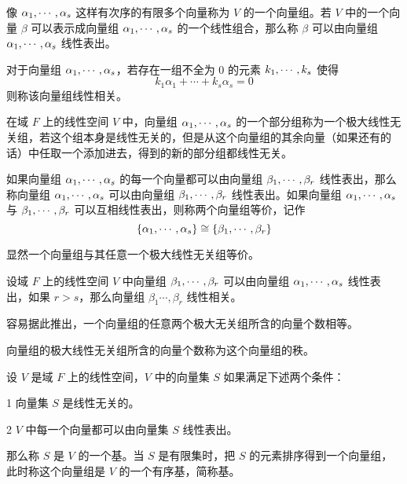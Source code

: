 像 $\alpha_1,\cdots,\alpha_s$ 这样有次序的有限多个向量称为 $V$ 的一个向量组。若 $V$ 中的一个向量 $\beta$ 可以表示成向量组 $\alpha_1,\cdots,\alpha_s$ 的一个线性组合，那么称 $\beta$ 可以由向量组 $\alpha_1,\cdots,\alpha_s$ 线性表出。

\begin{definition}[线性相关]
    对于向量组 $\alpha_1,\cdots,\alpha_s$，若存在一组不全为 $0$ 的元素 $k_1,\cdots,k_s$ 使得
    \[ k_1\alpha_1 + \cdots + k_s\alpha_s = 0 \]
    则称该向量组线性相关。
\end{definition}

\begin{definition}
    在域 $F$ 上的线性空间 $V$ 中，向量组 $\alpha_1,\cdots,\alpha_s$ 的一个部分组称为一个极大线性无关组，若这个组本身是线性无关的，但是从这个向量组的其余向量（如果还有的话）中任取一个添加进去，得到的新的部分组都线性无关。
\end{definition}

\begin{definition}
    如果向量组 $\alpha_1,\cdots,\alpha_s$ 的每一个向量都可以由向量组 $\beta_1,\cdots,\beta_r$ 线性表出，那么称向量组 $\alpha_1,\cdots,\alpha_s$ 可以由向量组 $\beta_1,\cdots,\beta_r$ 线性表出。如果向量组 $\alpha_1,\cdots,\alpha_s$ 与 $\beta_1,\cdots,\beta_r$ 可以互相线性表出，则称两个向量组等价，记作
    \[ \{ \alpha_1, \cdots,\alpha_s \} \cong \{\beta_1,\cdots,\beta_r\}\]
\end{definition}

显然一个向量组与其任意一个极大线性无关组等价。

\begin{theorem}
    设域 $F$ 上的线性空间 $V$ 中向量组 $\beta_1,\cdots,\beta_r$ 可以由向量组 $\alpha_1,\cdots,\alpha_s$ 线性表出，如果 $r>s$，那么向量组 $\beta_1\cdots,\beta_r$ 线性相关。
\end{theorem}

容易据此推出，一个向量组的任意两个极大无关组所含的向量个数相等。

\begin{definition}
    向量组的极大线性无关组所含的向量个数称为这个向量组的秩。
\end{definition}

\begin{definition}
    设 $V$ 是域 $F$ 上的线性空间，$V$ 中的向量集 $S$ 如果满足下述两个条件：

    \num{1} 向量集 $S$ 是线性无关的。

    \num{2} $V$ 中每一个向量都可以由向量集 $S$ 线性表出。

    那么称 $S$ 是 $V$ 的一个基。当 $S$ 是有限集时，把 $S$ 的元素排序得到一个向量组，此时称这个向量组是 $V$ 的一个有序基，简称基。
\end{definition}

